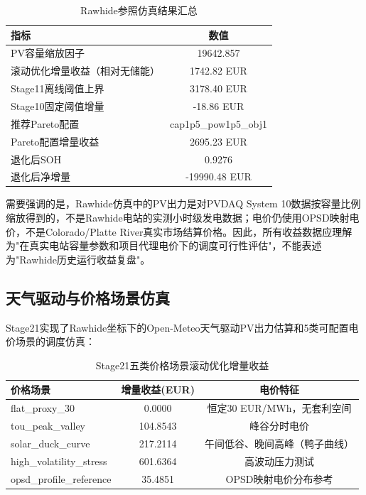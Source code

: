 \documentclass[12pt,a4paper]{ctexbook}
\begin{document}
\begin{table}[H]
\centering
\caption{Rawhide参照仿真结果汇总}
\label{tab:rawhide-results}
\begin{tabular}{@{}lc@{}}
\toprule
\textbf{指标} & \textbf{数值} \\
\midrule
PV容量缩放因子 & 19642.857 \\
滚动优化增量收益（相对无储能） & 1742.82 EUR \\
Stage11离线阈值上界 & 3178.40 EUR \\
Stage10固定阈值增量 & -18.86 EUR \\
推荐Pareto配置 & cap1p5\_pow1p5\_obj1 \\
Pareto配置增量收益 & 2695.23 EUR \\
退化后SOH & 0.9276 \\
退化后净增量 & -19990.48 EUR \\
\bottomrule
\end{tabular}
\end{table}

需要强调的是，Rawhide仿真中的PV出力是对PVDAQ System 10数据按容量比例缩放得到的，不是Rawhide电站的实测小时级发电数据；电价仍使用OPSD映射电价，不是Colorado/Platte River真实市场结算价格。因此，所有收益数据应理解为"在真实电站容量参数和项目代理电价下的调度可行性评估"，不能表述为"Rawhide历史运行收益复盘"。

\subsection{天气驱动与价格场景仿真}

Stage21实现了Rawhide坐标下的Open-Meteo天气驱动PV出力估算和5类可配置电价场景的调度仿真：

\begin{table}[H]
\centering
\caption{Stage21五类价格场景滚动优化增量收益}
\label{tab:stage21}
\begin{tabular}{@{}lcc@{}}
\toprule
\textbf{价格场景} & \textbf{增量收益(EUR)} & \textbf{电价特征} \\
\midrule
flat\_proxy\_30        & 0.0000   & 恒定30 EUR/MWh，无套利空间 \\
tou\_peak\_valley       & 104.8543 & 峰谷分时电价 \\
solar\_duck\_curve       & 217.2114 & 午间低谷、晚间高峰（鸭子曲线） \\
high\_volatility\_stress & 601.6364 & 高波动压力测试 \\
opsd\_profile\_reference & 35.4851  & OPSD映射电价分布参考 \\
\bottomrule
\end{tabular}
\end{table}
\end{document}
